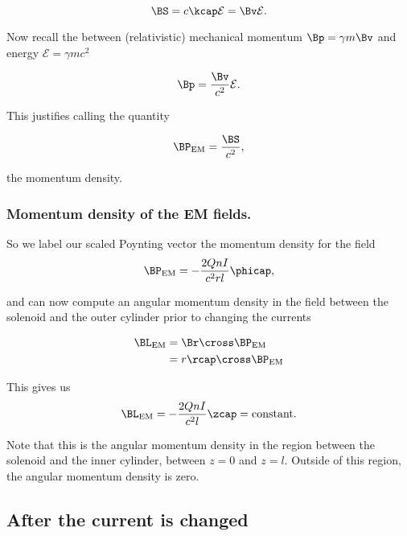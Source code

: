 \begin{equation}\label{eqn:relativisticElectrodynamicsT5:210}
\BS = c \kcap \mathcal{E} = \Bv \mathcal{E}.
\end{equation}

Now recall the between (relativistic) mechanical momentum $\Bp = \gamma m \Bv$ and energy $\mathcal{E} = \gamma m c^2$

\begin{equation}\label{eqn:relativisticElectrodynamicsT5:230}
\Bp = \frac{\Bv}{c^2} \mathcal{E}.
\end{equation}

This justifies calling the quantity

\begin{equation}\label{eqn:relativisticElectrodynamicsT5:250}
\BP_{\text{EM}} = \frac{\BS}{c^2},
\end{equation}

the momentum density.

\subsubsection{Momentum density of the EM fields.}

So we label our scaled Poynting vector the momentum density for the field
\begin{equation}\label{eqn:relativisticElectrodynamicsT5:270}
\BP_{\text{EM}} = -\frac{2 Q n I}{c^2 r l} \phicap,
\end{equation}

and can now compute an angular momentum density in the field between the solenoid and the outer cylinder prior to changing the currents

\begin{align*}
\BL_{\text{EM}}
&= \Br \cross \BP_{\text{EM}} \\
&= r \rcap \cross \BP_{\text{EM}} \\
\end{align*}

This gives us
\begin{equation}\label{eqn:relativisticElectrodynamicsT5:271}
\BL_{\text{EM}} = -\frac{2 Q n I}{c^2 l} \zcap = \text{constant}.
\end{equation}

Note that this is the angular momentum density in the region between the solenoid and the inner cylinder, between $z = 0$ and $z = l$.  Outside of this region, the angular momentum density is zero.

\subsection{After the current is changed}
